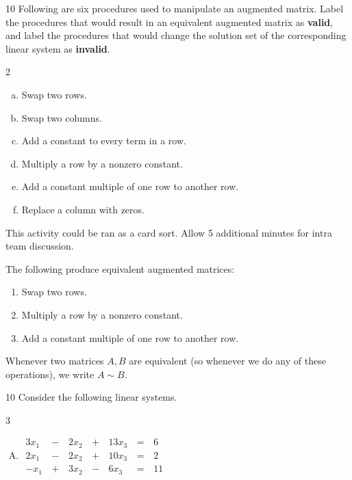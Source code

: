 \begin{applicationActivities}
\begin{activity}{10}
  Following are six procedures used to manipulate an augmented matrix.
  Label the procedures that would result in an equivalent augmented
  matrix as \textbf{valid}, and label the procedures that would
  change the solution set of the corresponding linear system as
  \textbf{invalid}.
  \begin{multicols}{2}
    \begin{enumerate}[a)]
      \item Swap two rows.
      \item Swap two columns.
      \item Add a constant to every term in a row.
      \item Multiply a row by a nonzero constant.
      \item Add a constant multiple of one row to another row.
      \item Replace a column with zeros.
    \end{enumerate}
  \end{multicols}
  \begin{TBLnote}
    This activity could be ran as a card sort.  Allow 5 additional minutes for intra team discussion.
  \end{TBLnote}
\end{activity}


\begin{definition}
  The following  produce equivalent
  augmented matrices:
  \begin{enumerate}
    \item Swap two rows.
    \item Multiply a row by a nonzero constant.
    \item Add a constant multiple of one row to another row.
  \end{enumerate}
  Whenever two matrices \(A,B\) are equivalent (so whenever we do any of
  these operations), we write \(A\sim B\).
\end{definition}

\begin{activity}{10}
  Consider the following  linear systems.
  \begin{multicols}{3}\noindent
  \begin{enumerate}[(A)]
    \item \(
		\begin{alignedat}{4}
   		  3x_1 &\,-\,& 2x_2 &\,+\,& 13x_3 &\,=\,& 6 \\
   		  2x_1 &\,-\,& 2x_2 &\,+\,& 10x_3 &\,=\,& 2 \\
   		  -x_1 &\,+\,& 3x_2 &\,-\,&  6x_3 &\,=\,& 11
   		\end{alignedat}
	\)


\end{enumerate}
\end{multicols}
\end{activity}
\end{applicationActivities}
